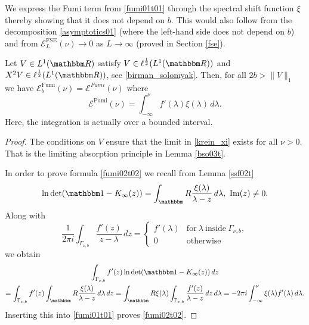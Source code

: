 We express the Fumi term from \eqref{fumi01t01} through 
the spectral shift function $\xi$ thereby showing that it does not depend on $b$. This would also
follow from the decomposition \eqref{asymptotics01} (where the left-hand side does not depend on $b$) 
and from $\mathcal{E}^{\mathrm{FSE}}_L(\nu)\to0$ as $L\to\infty$ (proved in Section \ref{fse}).

\begin{proposition}\label{fumi02t}
Let $V\in L^1(\R)$ satisfy
$V\in\ell^{\frac{1}{2}}(L^1(\R))$ and $X^2V\in\ell^{\frac{1}{2}}(L^1(\R))$, see \eqref{birman_solomyak}.
Then, for all $2b>\|V\|_1$ we have $\mathcal{E}^{\mathrm{Fumi}}_b(\nu)=\mathcal{E}^{Fumi}(\nu)$ where
\begin{equation}
  \mathcal{E}^{\text{Fumi}}(\nu)
       = \int_{-\infty}^\nu f'(\lambda)\xi(\lambda)\, d\lambda \label{fumi02t02} .
\end{equation}
Here, the integration is actually over a bounded interval.
\end{proposition}
\begin{proof}
The conditions on $V$ ensure that the limit in \eqref{krein_xi} exists for all $\nu>0$. That is the
limiting absorption principle in Lemma \ref{bso03t}.

In order to prove formula \eqref{fumi02t02} we recall from  Lemma \ref{ssf02t}
\begin{equation*}
  \ln\det(\id-K_\infty(z)) = \int_\R \frac{\xi(\lambda)}{\lambda-z}\, d\lambda,\ \im(z)\neq 0 .
\end{equation*}
Along with
\begin{equation*}
  \frac{1}{2\pi i}\int_{\Gamma_{\nu,b}} \frac{f'(z)}{z-\lambda}\, dz =
\begin{cases}
  f'(\lambda) & \text{for}\ \lambda\ \text{inside}\ \Gamma_{\nu,b} , \\
   0          & \text{otherwise}
\end{cases}
\end{equation*}
we obtain
\begin{multline*}
  \int_{\Gamma_{\nu,b}} f'(z)\ln\det(\id-K_\infty(z))\, dz\\
     = \int_{\Gamma_{\nu,b}} f'(z) \int_\R \frac{\xi(\lambda)}{\lambda-z}\, d\lambda\, dz
     = \int_\R \xi(\lambda)\int_{\Gamma_{\nu,b}} \frac{f'(z)}{\lambda-z}\, dz \, d\lambda
     = - 2\pi i \int_{-\infty}^\nu \xi(\lambda)f'(\lambda)\, d\lambda .
\end{multline*}
Inserting this into \eqref{fumi01t01} proves \eqref{fumi02t02}.
\end{proof}

